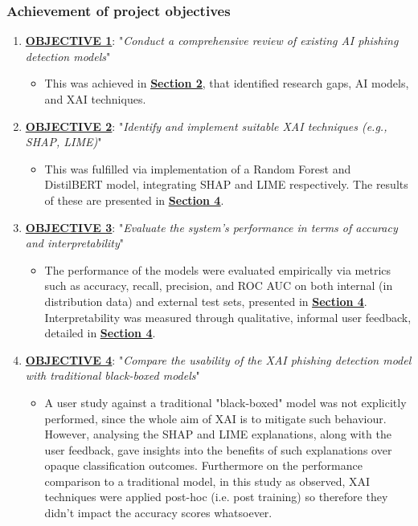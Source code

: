 
\subsubsection*{Achievement of project objectives}

\begin{enumerate}
  \item \uline{\textbf{OBJECTIVE 1}}: "\textit{Conduct a comprehensive review of existing AI phishing detection models}"
  \begin{itemize}
    \item This was achieved in \hyperref[sec:2-literature-review]{\uline{\textbf{Section 2}}}, that identified research gaps, AI models, and XAI techniques.
  \end{itemize}
  \item \uline{\textbf{OBJECTIVE 2}}: "\textit{Identify and implement suitable XAI techniques (e.g., SHAP, LIME)}"
  \begin{itemize}
    \item This was fulfilled via implementation of a Random Forest and DistilBERT model, integrating SHAP and LIME respectively. The results of these are presented in \hyperref[sec:4-results]{\uline{\textbf{Section 4}}}.
  \end{itemize}
  \item \uline{\textbf{OBJECTIVE 3}}: "\textit{Evaluate the system's performance in terms of accuracy and interpretability}"
  \begin{itemize}
    \item The performance of the models were evaluated empirically via metrics such as accuracy, recall, precision, and ROC AUC on both internal (in distribution data) and external test sets, presented in \hyperref[sec:4-results]{\uline{\textbf{Section 4}}}. Interpretability was measured through qualitative, informal user feedback, detailed in \hyperref[sec:4-results]{\uline{\textbf{Section 4}}}.
  \end{itemize}
  \item \uline{\textbf{OBJECTIVE 4}}: "\textit{Compare the usability of the XAI phishing detection model with traditional black-boxed models}"
  \begin{itemize}
    \item A user study against a traditional "black-boxed" model was not explicitly performed, since the whole aim of XAI is to mitigate such behaviour. However, analysing the SHAP and LIME explanations, along with the user feedback, gave insights into the benefits of such explanations over opaque classification outcomes. Furthermore on the performance comparison to a traditional model, in this study as observed, XAI techniques were applied post-hoc (i.e. post training) so therefore they didn't impact the accuracy scores whatsoever.
  \end{itemize}
\end{enumerate}
